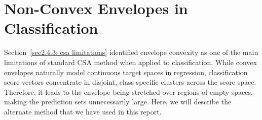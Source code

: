 
\section{Non-Convex Envelopes in Classification}
\label{sec3.2: non-convex envelopes}
Section~\ref{sec2.4.3: csa limitations} identified envelope convexity as one of the main limitations of standard CSA 
method \cite{ochoarivera2024conformal} when applied to classification. While convex envelopes naturally model 
continuous target spaces in regression, classification score vectors concentrate in disjoint, class-specific clusters across 
the score space. Therefore, it leads to the envelope being stretched over regions of empty spaces, making the prediction sets 
unnecessarily large. Here, we will describe the alternate method that we have used in this report.


